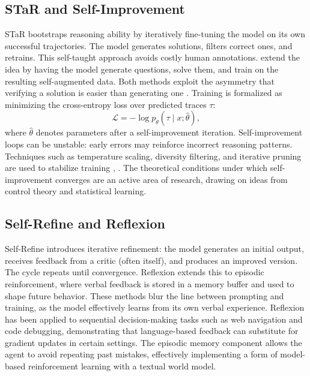 \documentclass[11pt,a4paper]{article}
\begin{document}
\subsection{STaR and Self-Improvement}
STaR \citep{zelikman2022star} bootstraps reasoning ability by iteratively fine-tuning the model on its own successful trajectories. The model generates solutions, filters correct ones, and retrains. This self-taught approach avoids costly human annotations. \citet{huang2022large} extend the idea by having the model generate questions, solve them, and train on the resulting self-augmented data. Both methods exploit the asymmetry that verifying a solution is easier than generating one \citep{uesato2022solving}. Training is formalized as minimizing the cross-entropy loss over predicted traces $\tau$:
\begin{equation}
\mathcal{L} = -\log p_\theta(\tau \mid x; \hat{\theta}),
\end{equation}
where $\hat{\theta}$ denotes parameters after a self-improvement iteration. Self-improvement loops can be unstable: early errors may reinforce incorrect reasoning patterns. Techniques such as temperature scaling, diversity filtering, and iterative pruning are used to stabilize training \citep{zelikman2022star}, \citep{huang2022large}. The theoretical conditions under which self-improvement converges are an active area of research, drawing on ideas from control theory and statistical learning.

\subsection{Self-Refine and Reflexion}
Self-Refine \citep{madaan2023self} introduces iterative refinement: the model generates an initial output, receives feedback from a critic (often itself), and produces an improved version. The cycle repeats until convergence. Reflexion \citep{shinn2023reflexion} extends this to episodic reinforcement, where verbal feedback is stored in a memory buffer and used to shape future behavior. These methods blur the line between prompting and training, as the model effectively learns from its own verbal experience. Reflexion has been applied to sequential decision-making tasks such as web navigation and code debugging, demonstrating that language-based feedback can substitute for gradient updates in certain settings. The episodic memory component allows the agent to avoid repeating past mistakes, effectively implementing a form of model-based reinforcement learning with a textual world model.
\end{document}
